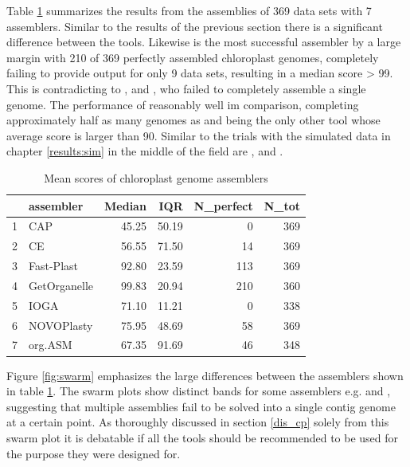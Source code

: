 Table \ref{tab:scores_real} summarizes the results from the assemblies of 369 data sets with 7
assemblers. Similar to the results of the previous section there is a significant difference between the
tools. Likewise \go is the most successful assembler by a large margin with 210 of 369 perfectly assembled
chloroplast genomes, completely failing to provide output for only 9 data sets, resulting in a median score >
99.  This is contradicting to \go, \cassp and \ioga, who failed to completely assemble a single genome. The
performance of \fp reasonably well im comparison, completing approximately half as many genomes as \go
and being the only other tool whose average score is larger than 90. Similar to the trials with the simulated
data in chapter \ref{results:sim} in the middle of the field are \ce, \hspace{0.5ex} \np \hspace{0.5ex} and
\oa.


\begin{table}[H]
\caption{Mean scores of chloroplast genome assemblers}
\label{tab:scores_real}
\centering
\begin{tabular}{rlrrrr}
  \hline
  & assembler & Median & IQR & N\_perfect & N\_tot \\ 
  \hline
  1 & CAP & 45.25 & 50.19 &  0 & 369 \\ 
  2 & CE & 56.55 & 71.50 & 14 & 369 \\ 
  3 & Fast-Plast & 92.80 & 23.59 & 113 & 369 \\ 
  4 & GetOrganelle & 99.83 & 20.94 & 210 & 360 \\ 
  5 & IOGA & 71.10 & 11.21 & 0 & 338 \\ 
  6 & NOVOPlasty & 75.95 & 48.69 & 58 & 369 \\ 
  7 & org.ASM & 67.35 & 91.69 & 46 & 348 \\ 
  \hline
\end{tabular}
\end{table}


Figure \ref{fig:swarm} emphasizes the large differences between the assemblers shown in table
\ref{tab:scores_real}. The swarm plots show distinct bands for some assemblers e.g. \np and \oa, suggesting
that multiple assemblies fail to be solved into a single contig genome at a certain point. As thoroughly
discussed in section \ref{dis_cp} solely from this swarm plot it is debatable if all the tools should be
recommended to be used for the purpose they were designed for.

